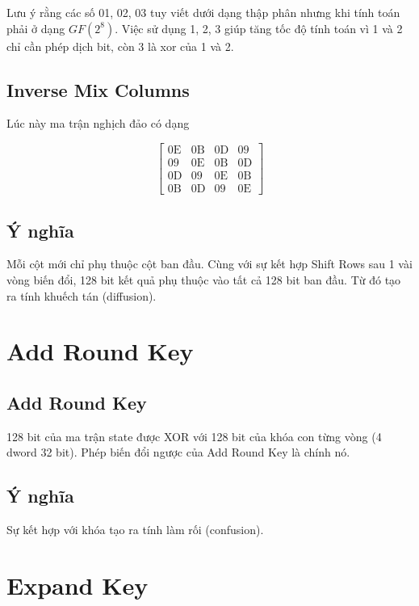 Lưu ý rằng các số 01, 02, 03 tuy viết dưới dạng thập phân nhưng khi tính toán phải ở dạng $GF(2^8)$. Việc sử dụng 1, 2, 3 giúp tăng tốc độ tính toán vì 1 và 2 chỉ cần phép dịch bit, còn 3 là xor của 1 và 2.

\subsection{Inverse Mix Columns}

Lúc này ma trận nghịch đảo có dạng

\[\begin{bmatrix}
    \text{0E} & \text{0B} & \text{0D} & \text{09} \\
    \text{09} & \text{0E} & \text{0B} & \text{0D} \\
    \text{0D} & \text{09} & \text{0E} & \text{0B} \\
    \text{0B} & \text{0D} & \text{09} & \text{0E}
\end{bmatrix}\]

\subsection{Ý nghĩa}

Mỗi cột mới chỉ phụ thuộc cột ban đầu. Cùng với sự kết hợp Shift Rows sau 1 vài vòng biến đổi, 128 bit kết quả phụ thuộc vào tất cả 128 bit ban đầu.
Từ đó tạo ra tính khuếch tán (diffusion).

\section{Add Round Key}

\subsection{Add Round Key}

128 bit của ma trận state được XOR với 128 bit của khóa con từng vòng (4 dword 32 bit). Phép biến đổi ngược của Add Round Key là chính nó.

\subsection{Ý nghĩa}

Sự kết hợp với khóa tạo ra tính làm rối (confusion).

\section{Expand Key}

